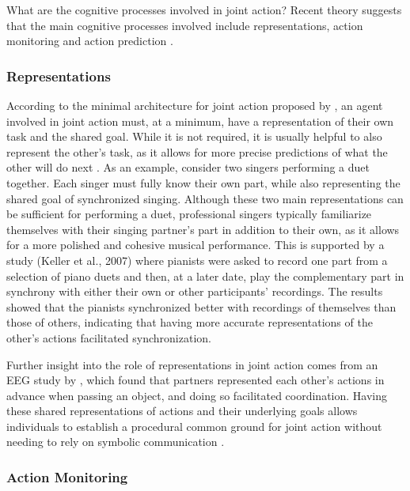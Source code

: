 \documentclass[10pt,a4paper,onecolumn]{article}
\begin{document}
What are the cognitive processes involved in joint action? Recent theory suggests that the main cognitive processes involved include representations, action monitoring and action prediction \autocite{vesperMinimalArchitectureJoint2010,loehrMonitoringIndividualJoint2013,sebanzJointActionBodies2006}.

\hypertarget{representations}{%
\subsubsection{Representations}\label{representations}}

According to the minimal architecture for joint action proposed by \textcite{vesperMinimalArchitectureJoint2010}, an agent involved in joint action must, at a minimum, have a representation of their own task and the shared goal. While it is not required, it is usually helpful to also represent the other's task, as it allows for more precise predictions of what the other will do next \autocite{boltSensoryAttenuationAuditory2021}. As an example, consider two singers performing a duet together. Each singer must fully know their own part, while also representing the shared goal of synchronized singing. Although these two main representations can be sufficient for performing a duet, professional singers typically familiarize themselves with their singing partner's part in addition to their own, as it allows for a more polished and cohesive musical performance. This is supported by a study (Keller et al., 2007) where pianists were asked to record one part from a selection of piano duets and then, at a later date, play the complementary part in synchrony with either their own or other participants' recordings. The results showed that the pianists synchronized better with recordings of themselves than those of others, indicating that having more accurate representations of the other's actions facilitated synchronization.

Further insight into the role of representations in joint action comes from an EEG study by \textcite{kourtisPredictiveRepresentationOther2012}, which found that partners represented each other's actions in advance when passing an object, and doing so facilitated coordination. Having these shared representations of actions and their underlying goals allows individuals to establish a procedural common ground for joint action without needing to rely on symbolic communication \autocite{sebanzJointActionBodies2006}.

\hypertarget{action-monitoring}{%
\subsubsection{Action Monitoring}\label{action-monitoring}}
\end{document}
